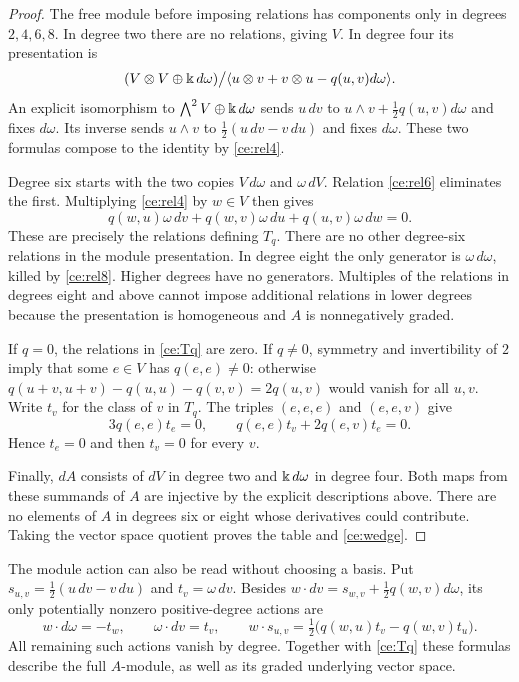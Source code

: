 \begin{proof}
The free module before imposing relations has components only in
degrees $2,4,6,8$.  In degree two there are no relations, giving $V$.
In degree four its presentation is
\[
 (V\otimes V\oplus \Bbbk\,d\omega)
 \big/\langle u\otimes v+v\otimes u-q(u,v)d\omega\rangle.
\]
An explicit isomorphism to $\bigwedge^2V\oplus \Bbbk\,d\omega$ sends
$u\,dv$ to $u\wedge v+\tfrac12q(u,v)d\omega$ and fixes $d\omega$.
Its inverse sends $u\wedge v$ to
$\tfrac12(u\,dv-v\,du)$ and fixes $d\omega$.  These two formulas
compose to the identity by \eqref{ce:rel4}.

Degree six starts with the two copies $V\,d\omega$ and $\omega\,dV$.
Relation \eqref{ce:rel6} eliminates the first.  Multiplying
\eqref{ce:rel4} by $w\in V$ then gives
\[
 q(w,u)\omega\,dv+q(w,v)\omega\,du+q(u,v)\omega\,dw=0.
\]
These are precisely the relations defining $T_q$.  There are no other
degree-six relations in the module presentation.  In degree eight the
only generator is $\omega\,d\omega$, killed by \eqref{ce:rel8}.
Higher degrees have no generators.  Multiples of the relations in
degrees eight and above cannot impose additional relations in lower
degrees because the presentation is homogeneous and $A$ is nonnegatively
graded.

If $q=0$, the relations in \eqref{ce:Tq} are zero.  If $q\ne0$, symmetry
and invertibility of $2$ imply that some $e\in V$ has $q(e,e)\ne0$:
otherwise $q(u+v,u+v)-q(u,u)-q(v,v)=2q(u,v)$ would vanish for all $u,v$.
Write $t_v$ for the class of $v$ in $T_q$.  The triples $(e,e,e)$ and
$(e,e,v)$ give
\[
 3q(e,e)t_e=0,\qquad q(e,e)t_v+2q(e,v)t_e=0.
\]
Hence $t_e=0$ and then $t_v=0$ for every $v$.

Finally, $dA$ consists of $dV$ in degree two and $\Bbbk\,d\omega$ in
degree four.  Both maps from these summands of $A$ are injective by the
explicit descriptions above.  There are no elements of $A$ in degrees
six or eight whose derivatives could contribute.  Taking the vector
space quotient proves the table and \eqref{ce:wedge}.
\end{proof}

The module action can also be read without choosing a basis.  Put
$s_{u,v}=\tfrac12(u\,dv-v\,du)$ and $t_v=\omega\,dv$.
Besides $w\cdot dv=s_{w,v}+\tfrac12q(w,v)d\omega$, its only potentially
nonzero positive-degree actions are
\[
 w\cdot d\omega=-t_w,\qquad \omega\cdot dv=t_v,\qquad
 w\cdot s_{u,v}=\tfrac12\bigl(q(w,u)t_v-q(w,v)t_u\bigr).
\]
All remaining such actions vanish by degree.  Together with
\eqref{ce:Tq} these formulas describe the full $A$-module, as well as its
graded underlying vector space.

